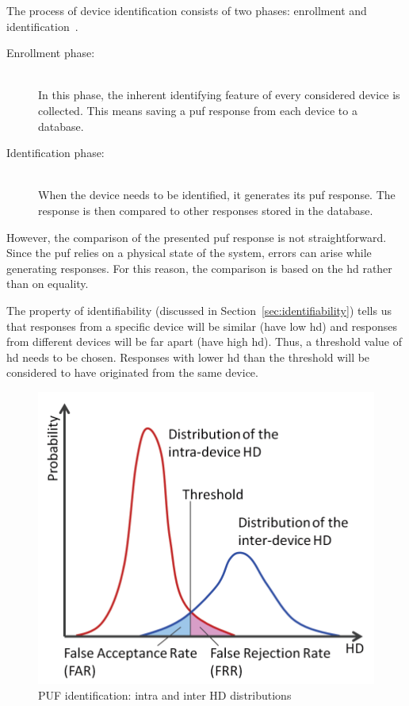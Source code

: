 The process of device identification consists of two phases: enrollment and identification~\cite{Maes2012}.

\begin{description}
    \item[Enrollment phase:] \hfill \\ In this phase, the inherent identifying feature of every considered device is collected. This means saving a \gls{puf} response from each device to a database.
    \item[Identification phase:] \hfill \\ When the device needs to be identified, it generates its \gls{puf} response. The response is then compared to other responses stored in the database.
\end{description}

However, the comparison of the presented \gls{puf} response is not straightforward. Since the \gls{puf} relies on a physical state of the system, errors can arise while generating responses. For this reason, the comparison is based on the \gls{hd} rather than on equality.

The property of identifiability (discussed in Section~\ref{sec:identifiability}) tells us that responses from a specific device will be similar (have low \gls{hd}) and responses from different devices will be far apart (have high \gls{hd}). Thus, a threshold value of \gls{hd} needs to be chosen. Responses with lower \gls{hd} than the threshold will be considered to have originated from the same device.

\begin{figure}[h!]
    \centering
    \captionsetup{justification=centering,margin=0.5cm}
    \includegraphics[scale=0.225]{images/identification_histogram.png}
    \caption[PUF identification: intra and inter HD distributions]{PUF identification: intra and inter HD distributions~\cite{Hori2013}}
    \label{fig:puf_inter_intra_hd}
\end{figure}

